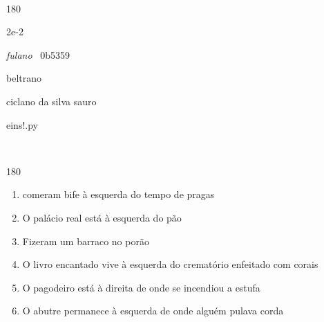 \documentclass[12pt]{article}
\begin{document}
\ttfamily


	\ 
	\vfill
	\begin{turn}{180}	
		\begin{minipage}{\textwidth}
			\centering
			{\Huge 2e-2}	
			
			\hfill
			
			\textit{fulano} 
			\ 
			0b5359
			
			
			beltrano
			
			ciclano da silva sauro
			
			\bigskip
			
			eins!.py
		\end{minipage}	
	\end{turn}
	\vfill
	\

\pagebreak

	\begin{turn}{180}	
		\begin{minipage}{\textwidth}
				
		\end{minipage}	
	\end{turn} 

\pagebreak
\sffamily
\large

	\begin{enumerate}
		\vfill \item comeram bife à esquerda do tempo de pragas 
		\vfill \item O palácio real está à esquerda do pão 
		\vfill \item Fizeram um barraco  no porão 
		\vfill \item O livro encantado vive à esquerda do crematório enfeitado com corais 
		\vfill \item O pagodeiro está à direita de onde se incendiou a estufa
		\vfill \item O abutre permanece à esquerda de onde alguém pulava corda
		
	\end{enumerate}
\end{document}
